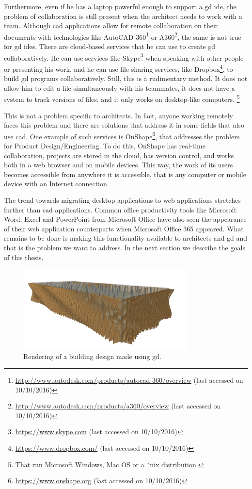 Furthermore, even if he has a laptop powerful enough to support a \gls{gd} \gls{ide}, the problem of collaboration is still present when the architect needs to work with a team.
Although \gls{cad} applications allow for remote collaboration on their documents with technologies like AutoCAD 360\footnote{\url{http://www.autodesk.com/products/autocad-360/overview} (last accessed on 10/10/2016)} or A360\footnote{\url{http://www.autodesk.com/products/a360/overview} (last accessed on 10/10/2016)}, the same is not true for \gls{gd} \glspl{ide}.
There are cloud-based services that he can use to create \gls{gd} collaboratively.
He can use services like Skype\footnote{\url{https://www.skype.com} (last accessed on 10/10/2016)} when speaking with other people or presenting his work, and he can use file sharing services, like Dropbox\footnote{\url{https://www.dropbox.com/} (last accessed on 10/10/2016)}, to build \gls{gd} programs collaboratively.
Still, this is a rudimentary method.
It does not allow him to edit a file simultaneously with his teammates, it does not have a system to track versions of files, and it only works on desktop-like computers.%
\footnote{That run Microsoft Windows, Mac OS or a *nix distribution.}

This is not a problem specific to architects.
In fact, anyone working remotely faces this problem and there are solutions that address it in some fields that also use \gls{cad}.
One example of such services is OnShape\footnote{\url{https://www.onshape.org} (last accessed on 10/10/2016)}, that addresses the problem for Product Design/Engineering.
To do this, OnShape has real-time collaboration, projects are stored in the cloud, has version control, and works both in a web browser and on mobile devices.
This way, the work of its users becomes accessible from anywhere it is accessible, that is any computer or mobile device with an Internet connection.

The trend towards migrating desktop applications to web applications stretches further than \gls{cad} applications.
Common office productivity tools like Microsoft Word, Excel and PowerPoint from Microsoft Office have also seen the appearance of their web application counterparts when Microsoft Office 365 appeared.
What remains to be done is making this functionality available to architects and \gls{gd} and that is the problem we want to address.
In the next section we describe the goals of this thesis.

\begin{figure}
	\centering
	\includegraphics[width=0.8\textwidth]{images/carmo_render}
	\caption{Rendering of a building design made using \gls{gd}.}
	\label{fig:carmo:render}
\end{figure}


